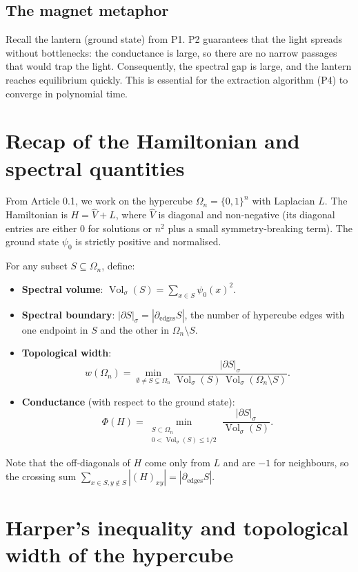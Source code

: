 \documentclass[11pt,a4paper]{article}
\begin{document}
\subsection*{The magnet metaphor}

Recall the lantern (ground state) from P1. P2 guarantees that the light spreads without bottlenecks: the conductance is large, so there are no narrow passages that would trap the light. Consequently, the spectral gap is large, and the lantern reaches equilibrium quickly. This is essential for the extraction algorithm (P4) to converge in polynomial time.

\section{Recap of the Hamiltonian and spectral quantities}

From Article 0.1, we work on the hypercube \(\Omega_n = \{0,1\}^n\) with Laplacian \(L\). The Hamiltonian is \(H = \hat{V} + L\), where \(\hat{V}\) is diagonal and non‑negative (its diagonal entries are either \(0\) for solutions or \(n^2\) plus a small symmetry‑breaking term). The ground state \(\psi_0\) is strictly positive and normalised.

For any subset \(S\subseteq\Omega_n\), define:
\begin{itemize}
\item \textbf{Spectral volume}: \(\operatorname{Vol}_\sigma(S) = \sum_{x\in S} \psi_0(x)^2\).
\item \textbf{Spectral boundary}: \(|\partial S|_\sigma = |\partial_{\mathrm{edges}} S|\), the number of hypercube edges with one endpoint in \(S\) and the other in \(\Omega_n\setminus S\).
\item \textbf{Topological width}:
  \[
  w(\Omega_n) = \min_{\emptyset\neq S\subsetneq\Omega_n} \frac{|\partial S|_\sigma}{\operatorname{Vol}_\sigma(S)\,\operatorname{Vol}_\sigma(\Omega_n\setminus S)}.
  \]
\item \textbf{Conductance} (with respect to the ground state):
  \[
  \Phi(H) = \min_{\substack{S\subset\Omega_n\\0<\operatorname{Vol}_\sigma(S)\le 1/2}} \frac{|\partial S|_\sigma}{\operatorname{Vol}_\sigma(S)}.
  \]
\end{itemize}
Note that the off‑diagonals of \(H\) come only from \(L\) and are \(-1\) for neighbours, so the crossing sum \(\sum_{x\in S,y\notin S} |(H)_{xy}| = |\partial_{\mathrm{edges}} S|\).

\section{Harper's inequality and topological width of the hypercube}
\end{document}
